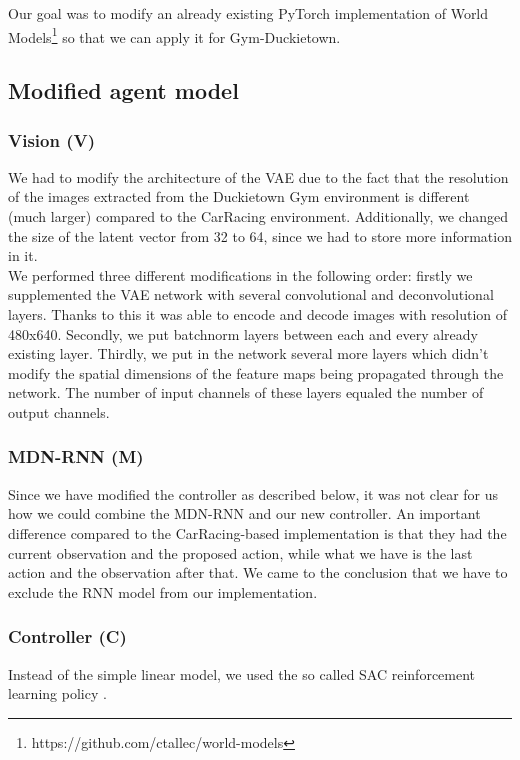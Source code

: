 \documentclass{article}
\begin{document}
Our goal was to modify an already existing PyTorch implementation of World Models\footnote{https://github.com/ctallec/world-models} so that we can apply it for Gym-Duckietown.

\subsection{Modified agent model}

\subsubsection{Vision (V)}
We had to modify the architecture of the VAE due to the fact that the resolution of the images extracted from the Duckietown Gym environment is different (much larger) compared to the CarRacing environment. Additionally, we changed the size of the latent vector from 32 to 64, since we had to store more information in it.\\
We performed three different modifications in the following order: firstly we supplemented the VAE network with several convolutional and deconvolutional layers. Thanks to this it was able to encode and decode images with resolution of 480x640. Secondly, we put batchnorm layers between each and every already existing layer. Thirdly, we put in the network several more layers which didn't modify the spatial dimensions of the feature maps being propagated through the network. The number of input channels of these layers equaled the number of output channels.

\subsubsection{MDN-RNN (M)}
Since we have modified the controller as described below, it was not clear for us how we could combine the MDN-RNN and our new controller. An important difference compared to the CarRacing-based implementation is that they had the current observation and the proposed action, while what we have is the last action and the observation after that. We came to the conclusion that we have to exclude the RNN model from our implementation.

\subsubsection{Controller (C)}
Instead of the simple linear model, we used the so called SAC reinforcement learning policy \cite{sac}.
\end{document}
